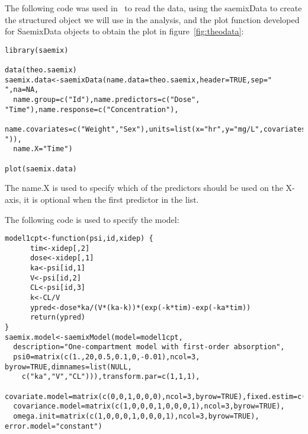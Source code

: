 The following code was used in \R~to read the data, using the saemixData to create the structured object we will use in the analysis, and the {\sf plot} function developed for SaemixData objects to obtain the plot in figure~\ref{fig:theodata}:
\begin{verbatim}
library(saemix)

data(theo.saemix)
saemix.data<-saemixData(name.data=theo.saemix,header=TRUE,sep=" ",na=NA, 
  name.group=c("Id"),name.predictors=c("Dose", "Time"),name.response=c("Concentration"), 
  name.covariates=c("Weight","Sex"),units=list(x="hr",y="mg/L",covariates=c("kg","-")), 
  name.X="Time")
  
plot(saemix.data)
\end{verbatim}
The {\sf name.X} is used to specify which of the predictors should be used on the X-axis, it is optional when the first predictor in the list.

The following code is used to specify the model:
\begin{verbatim}
model1cpt<-function(psi,id,xidep) { 
	  tim<-xidep[,2]  
	  dose<-xidep[,1]
	  ka<-psi[id,1]
	  V<-psi[id,2]
	  CL<-psi[id,3]
	  k<-CL/V
	  ypred<-dose*ka/(V*(ka-k))*(exp(-k*tim)-exp(-ka*tim))
	  return(ypred)
}
saemix.model<-saemixModel(model=model1cpt,
  description="One-compartment model with first-order absorption", 
  psi0=matrix(c(1.,20,0.5,0.1,0,-0.01),ncol=3, byrow=TRUE,dimnames=list(NULL, 
    c("ka","V","CL"))),transform.par=c(1,1,1), 
  covariate.model=matrix(c(0,0,1,0,0,0),ncol=3,byrow=TRUE),fixed.estim=c(1,1,1),
  covariance.model=matrix(c(1,0,0,0,1,0,0,0,1),ncol=3,byrow=TRUE), 
  omega.init=matrix(c(1,0,0,0,1,0,0,0,1),ncol=3,byrow=TRUE), error.model="constant")
\end{verbatim}

